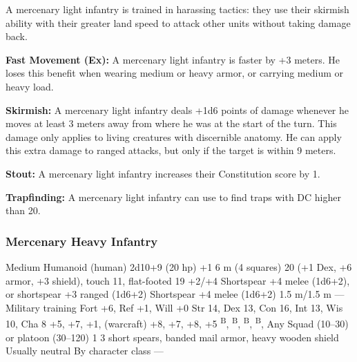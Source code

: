 A mercenary light infantry is trained in harassing tactics: they use their skirmish ability with their greater land speed to attack other units without taking damage back.

\textbf{Fast Movement (Ex):} A mercenary light infantry is faster by +3 meters. He loses this benefit when wearing medium or heavy armor, or carrying medium or heavy load.

\textbf{Skirmish:} A mercenary light infantry deals +1d6 points of damage whenever he moves at least 3 meters away from where he was at the start of the turn. This damage only applies to living creatures with discernible anatomy. He can apply this extra damage to ranged attacks, but only if the target is within 9 meters.

\textbf{Stout:} A mercenary light infantry increases their Constitution score by 1.

\textbf{Trapfinding:} A mercenary light infantry can use  to find traps with DC higher than 20.

\subsubsection{Mercenary Heavy Infantry}
\begin{MonsterStats}
{Medium Humanoid (human)}
{2d10+9 (20 hp)}
{+1}
{6 m (4 squares)}
{20 (+1 Dex, +6 armor, +3 shield), touch 11, flat-footed 19}
{+2/+4}
{Shortspear +4 melee (1d6+2), or shortspear +3 ranged (1d6+2)}
{Shortspear +4 melee (1d6+2)}
{1.5 m/1.5 m}
{---}
{Military training}
{Fort +6, Ref +1, Will +0}
{Str 14, Dex 13, Con 16, Int 13, Wis 10, Cha 8}
{
     +5,
     +7,
     +1,
     (warcraft) +8,
     +7,
     +8,
     +5
}
{
    \textsuperscript{B},
    \textsuperscript{B},
    \textsuperscript{B},
    \textsuperscript{B},
}
{Any}
{Squad (10--30) or platoon (30--120)}
{1}
{
    3 short spears,
    banded mail armor,
    heavy wooden shield
}
{Usually neutral}
{By character class}
{---}
\end{MonsterStats}


